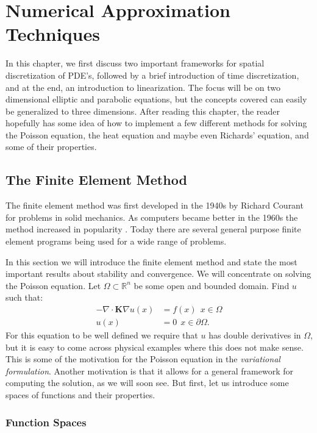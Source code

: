 \documentclass[../Main/main.tex]{subfiles}
\begin{document}
	\graphicspath{{../Discretization/figs/}}
	\chapter{Numerical Approximation Techniques}
	In this chapter, we first discuss two important frameworks for spatial discretization of PDE's, followed by a brief introduction of time discretization, and at the end, an introduction to linearization. The focus will be on two dimensional elliptic and parabolic equations, but the concepts covered can easily be generalized to three dimensions. After reading this chapter, the reader hopefully has some idea of how to implement a few different methods for solving the Poisson equation, the heat equation and maybe even Richards' equation, and some of their properties. 
	\section{The Finite Element Method}\label{sec:fem}

	The finite element method was first developed in the 1940s by Richard Courant for problems in solid mechanics. As computers became better in the 1960s the method increased in popularity \cite{Stein2014}. Today there are several general purpose finite element programs being used for a wide range of problems.\par
	In this section we will introduce the finite element method and state the most important results about stability and convergence.
	We will concentrate on solving the Poisson equation. Let $\Omega \subset \mathbb{R}^n$ be some open and bounded domain. Find $u$ such that:
	\begin{equation} \label{eq:poisson}
		\begin{split}
			-\nabla \cdot \bm{K} \nabla u(x) &= f(x) \ \  x\in \Omega \\ 
			u(x) &= 0 \ \ x\in \partial \Omega.
		\end{split}
	\end{equation}
	For this equation to be well defined we require that $u$ has double derivatives in $\Omega$, but it is easy to come across physical examples where this does not make sense.
	This is some of the motivation for the Poisson equation in the \emph{variational formulation}. Another motivation is that it allows for a general framework for computing the solution, as we will soon see. But first, let us introduce some spaces of functions and their properties.
	
	
	\subsection{Function Spaces}
\end{document}
